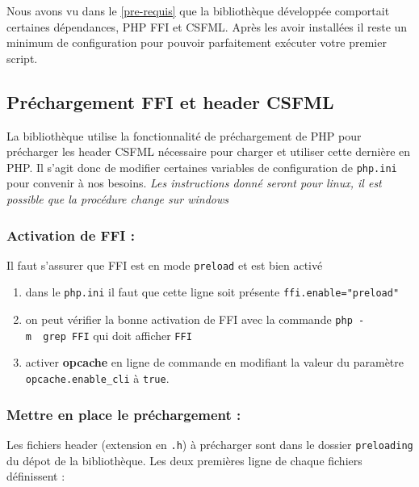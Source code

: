 \documentclass[11pt,a4paper,krantz2,11pt,oneside]{krantz}
\begin{document}
Nous avons vu dans le \ref{pre-requis} que la bibliothèque développée comportait certaines dépendances, PHP FFI et CSFML. Après les avoir installées il reste un minimum de configuration pour pouvoir parfaitement exécuter votre premier script.

\hypertarget{pruxe9chargement-ffi-et-header-csfml}{%
\subsection{Préchargement FFI et header CSFML}\label{pruxe9chargement-ffi-et-header-csfml}}

La bibliothèque utilise la fonctionnalité de préchargement de PHP pour précharger les header CSFML nécessaire pour charger et utiliser cette dernière en PHP. Il s'agit donc de modifier certaines variables de configuration de \texttt{php.ini} pour convenir à nos besoins. \emph{Les instructions donné seront pour linux, il est possible que la procédure change sur windows}

\hypertarget{activation-de-ffi}{%
\subsubsection{Activation de FFI :}\label{activation-de-ffi}}

Il faut s'assurer que FFI est en mode \texttt{preload} et est bien activé

\begin{enumerate}
\def\labelenumi{\arabic{enumi}.}
\item
  dans le \texttt{php.ini} il faut que cette ligne soit présente \texttt{ffi.enable="preload"}
\item
  on peut vérifier la bonne activation de FFI avec la commande \texttt{php\ -m\ \textbar{}\ grep\ FFI} qui doit afficher \texttt{FFI}
\item
  activer \textbf{opcache} en ligne de commande en modifiant la valeur du paramètre \texttt{opcache.enable\_cli} à \texttt{true}.
\end{enumerate}

\hypertarget{mettre-en-place-le-pruxe9chargement}{%
\subsubsection{Mettre en place le préchargement :}\label{mettre-en-place-le-pruxe9chargement}}

Les fichiers header (extension en \texttt{.h}) à précharger sont dans le dossier \texttt{preloading} du dépot de la bibliothèque. Les deux premières ligne de chaque fichiers définissent :
\end{document}
